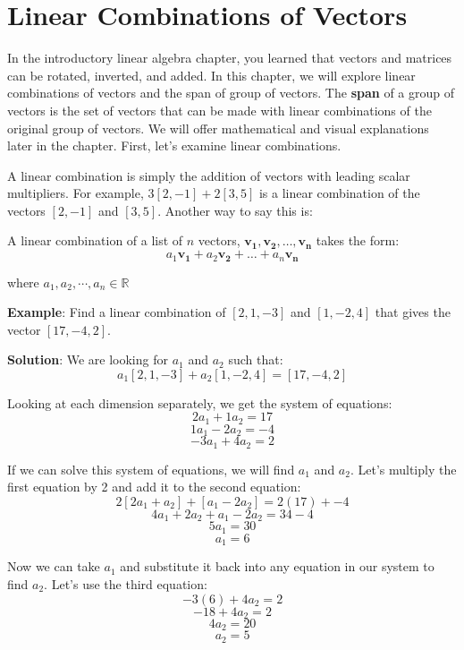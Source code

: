 \chapter{Linear Combinations of Vectors}

In the introductory linear algebra chapter, you learned that vectors and 
matrices can be rotated, inverted, and added. In this chapter, we will explore 
linear combinations of vectors and the span of group of vectors. The 
\textbf{span} of a group of vectors is the set of vectors that can 
be made with linear combinations of the original group of vectors. We will 
offer mathematical and visual explanations later in the chapter. First, let's 
examine linear combinations. 

A linear combination is simply the addition of vectors with leading scalar 
multipliers. For example, $3 \left[ 2, -1 \right] + 2 \left[ 3, 5 \right]$ is 
a linear combination of the vectors $\left[ 2, -1 \right]$ and $\left[ 3, 5 
\right]$. Another way to say this is:

\begin{mdframed}[style = important, frametitle = {Linear Combination of 
Vectors}]
A linear combination of a list of $n$ vectors, $\mathbf{v_1}, \mathbf{v_2}, \dots, \mathbf{v_n}$ takes the form:
$$a_1 \mathbf{v_1} + a_2 \mathbf{v_2} + \dots + a_n \mathbf{v_n}$$

where $a_1, a_2, \cdots, a_n \in \mathbb{R}$
\end{mdframed}

\textbf{Example}: Find a linear combination of $\left[ 2, 1, -3 \right]$ and 
$\left[ 1, -2, 4 \right]$ that gives the vector $\left[ 17, -4, 2 \right]$.

\textbf{Solution}: We are looking for $a_1$ and $a_2$ such that:
$$a_1 \left[ 2, 1, -3 \right] + a_2 \left[ 1, -2, 4 \right] = \left[17, -4, 2 
\right]$$

Looking at each dimension separately, we get the system of equations:
$$2 a_1 + 1 a_2 = 17$$
$$1 a_1 - 2 a_2 = -4$$
$$-3 a_1 + 4 a_2 = 2$$

If we can solve this system of equations, we will find $a_1$ and $a_2$. Let's 
multiply the first equation by 2 and add it to the second equation:
$$2 \left[ 2 a_1 + a_2 \right] + \left[ a_1 - 2 a_2 \right] = 2 \left( 17 
\right) + -4$$
$$4 a_1 + 2 a_2 + a_1 - 2 a_2 = 34 - 4$$
$$5 a_1 = 30$$
$$a_1 = 6$$

Now we can take $a_1$ and substitute it back into any equation in our system 
to find $a_2$. Let's use the third equation:
$$-3 \left( 6 \right) + 4 a_2 = 2$$
$$ -18 + 4 a_2 = 2$$
$$4 a_2 = 20$$
$$a_2 = 5$$

